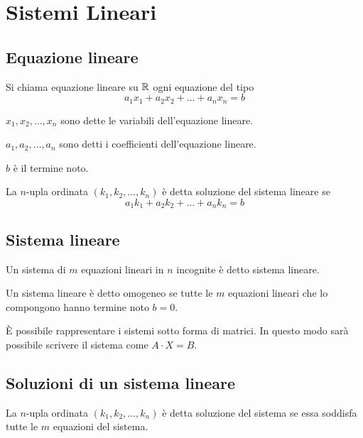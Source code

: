 \chapter{Sistemi Lineari}

\section{Equazione lineare}

\begin{definition}
Si chiama equazione lineare su $\mathbb{R}$ ogni equazione del tipo
$$ a_1x_1 + a_2x_2 + \ldots + a_nx_n = b$$
\end{definition}

$x_1, x_2, \ldots, x_n$ sono dette le variabili dell'equazione lineare.

$a_1, a_2, \ldots, a_n$ sono detti i coefficienti dell'equazione lineare.

$b$ è il termine noto.

\begin{definition}
La $n$-upla ordinata $(k_1, k_2, \ldots, k_n)$ è detta soluzione del sistema lineare se $$ a_1k_1 + a_2k_2 + \ldots + a_nk_n = b$$
\end{definition}

\section{Sistema lineare}

\begin{definition}
Un sistema di $m$ equazioni lineari in $n$ incognite è detto sistema lineare.
\end{definition}

\begin{definition}
Un sistema lineare è detto omogeneo se tutte le $m$ equazioni lineari che lo compongono hanno termine noto $b=0$.
\end{definition}

È possibile rappresentare i sistemi sotto forma di matrici. In questo modo sarà possibile scrivere il sistema come $A \cdot X=B$.

\section{Soluzioni di un sistema lineare}

\begin{definition}
La $n$-upla ordinata $(k_1, k_2, \ldots, k_n)$ è detta soluzione del sistema se essa soddisfa tutte le $m$ equazioni del sistema.
\end{definition}

